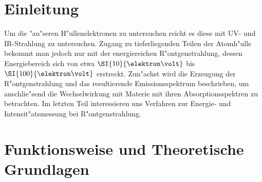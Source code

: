 \section{Einleitung}
	Um die "au"seren H"ullenelektronen zu untersuchen reicht es diese mit UV- und IR-Strahlung zu untersuchen. Zugang zu tieferliegenden Teilen der Atomh"ulle bekommt man jedoch nur mit der energiereichen R"ontgenstrahlung, dessen Energiebereich sich von etwa $\SI{10}{\elektron\volt}$ bis $\SI{100}{\elektron\volt}$ erstreckt.
	\vspace{0.3cm}
	Zun"achst wird die Erzeugung der R"ontgenstrahlung und das resultierende Emissionsspektrum beschrieben, um anschlie"send die Wechselwirkung mit Materie mit ihren Absorptionsspektren zu betrachten. Im letzten Teil interessieren uns Verfahren zur Energie- und Intensit"atsmessung bei R"ontgenstrahlung.

\section{Funktionsweise und Theoretische Grundlagen}
	